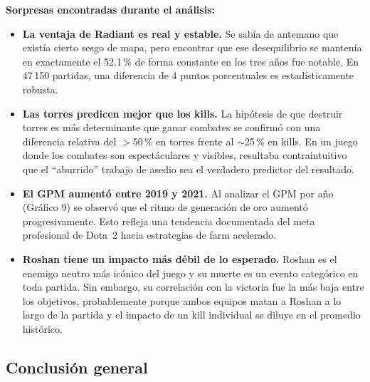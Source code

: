 \documentclass[12pt,a4paper]{article}
\begin{document}
\textbf{Sorpresas encontradas durante el an\'alisis:}
\begin{itemize}
  \item \textbf{La ventaja de Radiant es real y estable.} Se sab\'ia de
        antemano que exist\'ia cierto sesgo de mapa, pero encontrar que ese
        desequilibrio se manten\'ia en exactamente el 52.1\,\% de forma
        constante en los tres a\~nos fue notable. En 47\,150 partidas, una
        diferencia de 4 puntos porcentuales es estad\'isticamente robusta.
  \item \textbf{Las torres predicen mejor que los kills.} La hip\'otesis de
        que destruir torres es m\'as determinante que ganar combates se
        confirm\'o con una diferencia relativa del $>$50\,\% en torres frente
        al $\sim$25\,\% en kills. En un juego donde los combates son
        espect\'aculares y visibles, resultaba contraintuitivo que el ``aburrido''
        trabajo de asedio sea el verdadero predictor del resultado.
  \item \textbf{El GPM aument\'o entre 2019 y 2021.} Al analizar el GPM por
        a\~no (Gr\'afico 9) se observ\'o que el ritmo de generaci\'on de oro
        aument\'o progresivamente. Esto refleja una tendencia documentada del
        meta profesional de Dota~2 hacia estrategias de farm acelerado.
  \item \textbf{Roshan tiene un impacto m\'as d\'ebil de lo esperado.}
        Roshan es el enemigo neutro m\'as ic\'onico del juego y su muerte es
        un evento categ\'orico en toda partida. Sin embargo, su correlaci\'on
        con la victoria fue la m\'as baja entre los objetivos, probablemente
        porque ambos equipos matan a Roshan a lo largo de la partida y el
        impacto de un kill individual se diluye en el promedio hist\'orico.
\end{itemize}

\subsection*{Conclusi\'on general}
\end{document}
